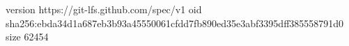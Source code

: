 version https://git-lfs.github.com/spec/v1
oid sha256:ebda34d1a687eb3b93a45550061cfdd7fb890ed35e3abf3395dff385558791d0
size 62454

